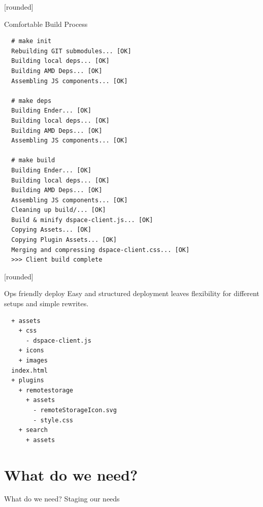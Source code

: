 \documentclass{beamer}
\newcommand\Fontvi{\fontsize{6}{7.2}\selectfont}
\begin{document}
[rounded]
\begin{frame}[fragile]{Comfortable Build Process}
\Fontvi
{}
\begin{block}{}
\begin{lstlisting}
  # make init
  Rebuilding GIT submodules... [OK]
  Building local deps... [OK]
  Building AMD Deps... [OK]
  Assembling JS components... [OK]

  # make deps
  Building Ender... [OK]
  Building local deps... [OK]
  Building AMD Deps... [OK]
  Assembling JS components... [OK]

  # make build
  Building Ender... [OK]
  Building local deps... [OK]
  Building AMD Deps... [OK]
  Assembling JS components... [OK]
  Cleaning up build/... [OK]
  Build & minify dspace-client.js... [OK]
  Copying Assets... [OK]
  Copying Plugin Assets... [OK]
  Merging and compressing dspace-client.css... [OK]
  >>> Client build complete
\end{lstlisting}
\end{block}
\end{frame}

[rounded]
\begin{frame}[fragile]{Ops friendly deploy}
Easy and structured deployment leaves flexibility for
different setups and simple rewrites.
\linebreak
\Fontvi
{}
\begin{block}{}
\begin{lstlisting}
  + assets
    + css
      - dspace-client.js
    + icons
    + images
  index.html
  + plugins
    + remotestorage
      + assets
        - remoteStorageIcon.svg
        - style.css
    + search
      + assets
\end{lstlisting}
\end{block}
\end{frame}



\section{What do we need?}

\begin{frame}{What do we need?}
 Staging our needs
\end{frame}
\end{document}
